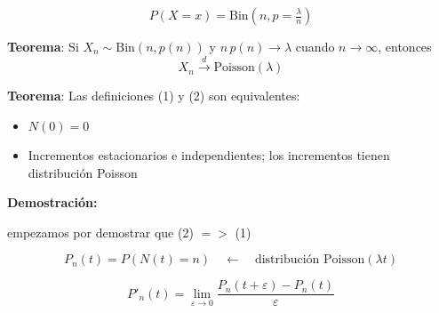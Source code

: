 \documentclass[12pt,a4paper]{article}
\newcommand{\teorema}[1]{%
\begin{teoremabox}
\textbf{Teorema}: #1
\end{teoremabox}
}
\begin{document}
\begin{center}
\end{center}

\begin{equation*}
P(X = x) = \text{Bin}(n, p = \tfrac{\lambda}{n})
\end{equation*}

\teorema{Si $X_n \sim \text{Bin}(n, p(n))$ y $n \, p(n) \to \lambda$ cuando $n \to \infty$, entonces
\begin{equation*}
X_n \xrightarrow{d} \text{Poisson}(\lambda)
\end{equation*}}

\teorema{Las definiciones (1) y (2) son equivalentes:
\begin{itemize}
    \item $N(0) = 0$
    \item Incrementos estacionarios e independientes; los incrementos tienen distribución Poisson
\end{itemize}}

\textbf{Demostración:}

empezamos por demostrar que (2) $= >$ (1)

\begin{equation*}
P_n(t) = P(N(t) = n) \quad \longleftarrow \quad \text{distribución Poisson}(\lambda t)
\end{equation*}

\begin{equation*}
P'_n(t) = \lim_{\varepsilon \to 0} \frac{P_n(t+\varepsilon) - P_n(t)}{\varepsilon}
\end{equation*}
\end{document}
